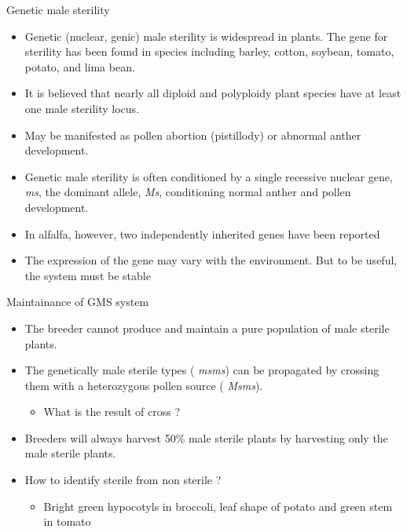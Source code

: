 \documentclass[11pt,ignorenonframetext,aspectratio=169]{beamer}
\providecommand{\tightlist}{%
  \setlength{\itemsep}{0pt}\setlength{\parskip}{0pt}}
\begin{document}
\begin{frame}{Genetic male sterility}
\protect\hypertarget{genetic-male-sterility}{}
\begin{itemize}
\tightlist
\item
  Genetic (nuclear, genic) male sterility is widespread in plants. The
  gene for sterility has been found in species including barley, cotton,
  soybean, tomato, potato, and lima bean.
\item
  It is believed that nearly all diploid and polyploidy plant species
  have at least one male sterility locus.
\item
  May be manifested as pollen abortion (pistillody) or abnormal anther
  development.
\item
  Genetic male sterility is often conditioned by a single recessive
  nuclear gene, \emph{ms}, the dominant allele, \emph{Ms}, conditioning
  normal anther and pollen development.
\item
  In alfalfa, however, two independently inherited genes have been
  reported
\item
  The expression of the gene may vary with the environment. But to be
  useful, the system must be stable
\end{itemize}
\end{frame}

\begin{frame}{Maintainance of GMS system}
\protect\hypertarget{maintainance-of-gms-system}{}
\begin{itemize}
\tightlist
\item
  The breeder cannot produce and maintain a pure population of male
  sterile plants.
\item
  The genetically male sterile types ( \emph{msms}) can be propagated by
  crossing them with a heterozygous pollen source ( \emph{Msms}).

  \begin{itemize}
  \tightlist
  \item
    What is the result of cross ?
  \end{itemize}
\item
  Breeders will always harvest 50\% male sterile plants by harvesting
  only the male sterile plants.
\item
  How to identify sterile from non sterile ?

  \begin{itemize}
  \tightlist
  \item
    Bright green hypocotyls in broccoli, leaf shape of potato and green
    stem in tomato
  \end{itemize}
\end{itemize}
\end{frame}
\end{document}
